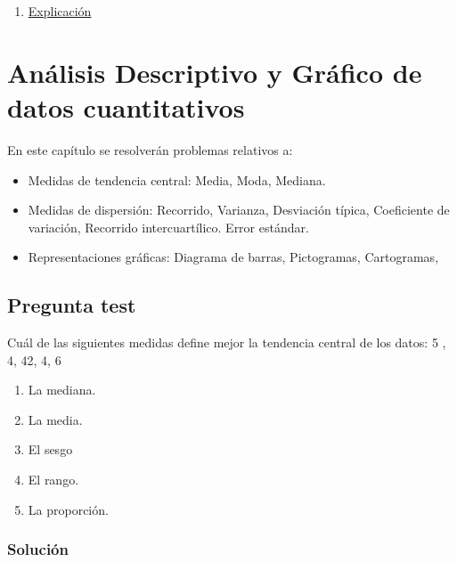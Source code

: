 \documentclass[
]{book}
\providecommand{\tightlist}{%
  \setlength{\itemsep}{0pt}\setlength{\parskip}{0pt}}
\begin{document}
\begin{enumerate}
\def\labelenumi{\alph{enumi})}
\setcounter{enumi}{2}
\tightlist
\item
  \href{https://1fjmanzano.github.io/bioestadistica/tablas-de-frecuencias.html}{Explicación}
\end{enumerate}

\hypertarget{anuxe1lisis-descriptivo-y-gruxe1fico-de-datos-cuantitativos}{%
\chapter{Análisis Descriptivo y Gráfico de datos cuantitativos}\label{anuxe1lisis-descriptivo-y-gruxe1fico-de-datos-cuantitativos}}

En este capítulo se resolverán problemas relativos a:

\begin{itemize}
\tightlist
\item
  Medidas de tendencia central: Media, Moda, Mediana.
\item
  Medidas de dispersión: Recorrido, Varianza, Desviación típica, Coeficiente de variación, Recorrido intercuartílico. Error estándar.
\item
  Representaciones gráficas: Diagrama de barras, Pictogramas, Cartogramas,
\end{itemize}

\hypertarget{pregunta-test-17}{%
\section{Pregunta test}\label{pregunta-test-17}}

Cuál de las siguientes medidas define mejor la tendencia central de los datos: 5 , 4, 42, 4, 6

\begin{enumerate}
\def\labelenumi{\alph{enumi})}
\tightlist
\item
  La mediana.
\item
  La media.
\item
  El sesgo
\item
  El rango.
\item
  La proporción.
\end{enumerate}

\hypertarget{soluciuxf3n-17}{%
\subsection{Solución}\label{soluciuxf3n-17}}
\end{document}
